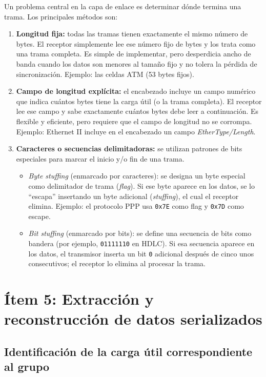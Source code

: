 \documentclass[12pt,a4paper]{article}
\begin{document}
Un problema central en la capa de enlace es determinar dónde termina una trama. Los principales métodos son:

\begin{enumerate}
  \item \textbf{Longitud fija:} todas las tramas tienen exactamente el mismo número de bytes. El receptor simplemente lee ese número fijo de bytes y los trata como una trama completa. Es simple de implementar, pero desperdicia ancho de banda cuando los datos son menores al tamaño fijo y no tolera la pérdida de sincronización. Ejemplo: las celdas ATM (53 bytes fijos).

  \item \textbf{Campo de longitud explícita:} el encabezado incluye un campo numérico que indica cuántos bytes tiene la carga útil (o la trama completa). El receptor lee ese campo y sabe exactamente cuántos bytes debe leer a continuación. Es flexible y eficiente, pero requiere que el campo de longitud no se corrompa. Ejemplo: Ethernet II incluye en el encabezado un campo \emph{EtherType/Length}.

  \item \textbf{Caracteres o secuencias delimitadoras:} se utilizan patrones de bits especiales para marcar el inicio y/o fin de una trama.
    \begin{itemize}
      \item \emph{Byte stuffing} (enmarcado por caracteres): se designa un byte especial como delimitador de trama (\emph{flag}). Si ese byte aparece en los datos, se lo ``escapa'' insertando un byte adicional (\emph{stuffing}), el cual el receptor elimina. Ejemplo: el protocolo PPP usa \texttt{0x7E} como flag y \texttt{0x7D} como escape.
      \item \emph{Bit stuffing} (enmarcado por bits): se define una secuencia de bits como bandera (por ejemplo, \texttt{01111110} en HDLC). Si esa secuencia aparece en los datos, el transmisor inserta un bit \texttt{0} adicional después de cinco unos consecutivos; el receptor lo elimina al procesar la trama.
    \end{itemize}
\end{enumerate}


\section{Ítem 5: Extracción y reconstrucción de datos serializados}

\subsection{Identificación de la carga útil correspondiente al grupo}
\end{document}
